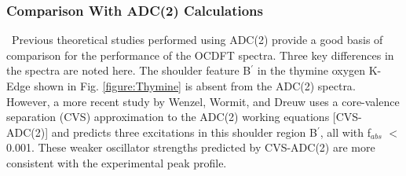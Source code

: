 \documentclass[8.5pt,twoside,twocolumn]{article}
\begin{document}
\subsubsection{Comparison With ADC(2) Calculations} \
Previous theoretical studies performed using ADC(2) provide a good basis of comparison for the performance of the OCDFT spectra. Three key differences in the spectra are noted here. 
The shoulder feature B$^{\prime}$ in the thymine oxygen K-Edge shown in Fig. \ref{figure:Thymine} is absent from the ADC(2) spectra\cite{plekan_theoretical_2008}. However, a more recent study by Wenzel, Wormit, and Dreuw \cite{wenzel_calculating_2014} uses a core-valence separation (CVS) approximation to the ADC(2) working equations [CVS-ADC(2)] and predicts three excitations in this shoulder region B$^{\prime}$, all with f$_{abs}$ $<$ 0.001. These weaker oscillator strengths predicted by CVS-ADC(2) are more consistent with the experimental peak profile.
\end{document}
